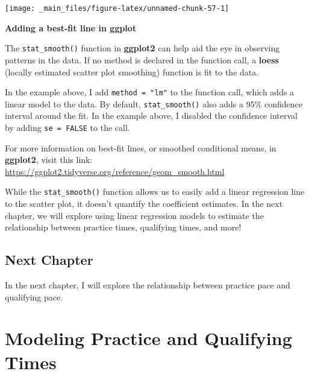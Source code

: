 \documentclass[
]{book}
\begin{document}
\begin{center}\texttt{[image: \_main\_files/figure-latex/unnamed-chunk-57-1]} \end{center}

\begin{blackbox}

\begin{center}
\textbf{Adding a best-fit line in ggplot}

\end{center}

The \texttt{stat\_smooth()} function in \textbf{ggplot2} can help aid the eye in observing patterns in the data. If no method is declared in the function call, a \textbf{loess} (locally estimated scatter plot smoothing) function is fit to the data.

In the example above, I add \texttt{method\ =\ "lm"} to the function call, which adds a linear model to the data. By default, \texttt{stat\_smooth()} also adds a 95\% confidence interval around the fit. In the example above, I disabled the confidence interval by adding \texttt{se\ =\ FALSE} to the call.

For more information on best-fit lines, or smoothed conditional means, in \textbf{ggplot2}, visit this link: \url{https://ggplot2.tidyverse.org/reference/geom_smooth.html}

\end{blackbox}

While the \texttt{stat\_smooth()} function allows us to easily add a linear regression line to the scatter plot, it doesn't quantify the coefficient estimates. In the next chapter, we will explore using linear regression models to estimate the relationship between practice times, qualifying times, and more!

\hypertarget{next-chapter-1}{%
\section{Next Chapter}\label{next-chapter-1}}

In the next chapter, I will explore the relationship between practice pace and qualifying pace.

\hypertarget{modeling-practice-and-qualifying-times}{%
\chapter{Modeling Practice and Qualifying Times}\label{modeling-practice-and-qualifying-times}}
\end{document}
